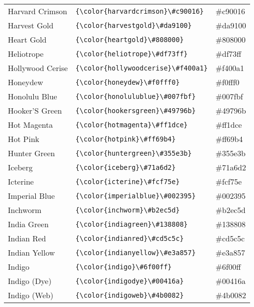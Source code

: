 \documentclass[9.5pt]{article}
\begin{document}
\begin{longtable}{l | l | l}
	Harvard Crimson & \verb!{\color{harvardcrimson}\#c90016}! & {\color{harvardcrimson}\#c90016}\\
	Harvest Gold & \verb!{\color{harvestgold}\#da9100}! & {\color{harvestgold}\#da9100}\\
	Heart Gold & \verb!{\color{heartgold}\#808000}! & {\color{heartgold}\#808000}\\
	Heliotrope & \verb!{\color{heliotrope}\#df73ff}! & {\color{heliotrope}\#df73ff}\\
	Hollywood Cerise & \verb!{\color{hollywoodcerise}\#f400a1}! & {\color{hollywoodcerise}\#f400a1}\\
	Honeydew & \verb!{\color{honeydew}\#f0fff0}! & {\color{honeydew}\#f0fff0}\\
	Honolulu Blue & \verb!{\color{honolulublue}\#007fbf}! & {\color{honolulublue}\#007fbf}\\
	Hooker'S Green & \verb!{\color{hookersgreen}\#49796b}! & {\color{hookersgreen}\#49796b}\\
	Hot Magenta & \verb!{\color{hotmagenta}\#ff1dce}! & {\color{hotmagenta}\#ff1dce}\\
	Hot Pink & \verb!{\color{hotpink}\#ff69b4}! & {\color{hotpink}\#ff69b4}\\
	Hunter Green & \verb!{\color{huntergreen}\#355e3b}! & {\color{huntergreen}\#355e3b}\\
	Iceberg & \verb!{\color{iceberg}\#71a6d2}! & {\color{iceberg}\#71a6d2}\\
	Icterine & \verb!{\color{icterine}\#fcf75e}! & {\color{icterine}\#fcf75e}\\
	Imperial Blue & \verb!{\color{imperialblue}\#002395}! & {\color{imperialblue}\#002395}\\
	Inchworm & \verb!{\color{inchworm}\#b2ec5d}! & {\color{inchworm}\#b2ec5d}\\
	India Green & \verb!{\color{indiagreen}\#138808}! & {\color{indiagreen}\#138808}\\
	Indian Red & \verb!{\color{indianred}\#cd5c5c}! & {\color{indianred}\#cd5c5c}\\
	Indian Yellow & \verb!{\color{indianyellow}\#e3a857}! & {\color{indianyellow}\#e3a857}\\
	Indigo & \verb!{\color{indigo}\#6f00ff}! & {\color{indigo}\#6f00ff}\\
	Indigo (Dye) & \verb!{\color{indigodye}\#00416a}! & {\color{indigodye}\#00416a}\\
	Indigo (Web) & \verb!{\color{indigoweb}\#4b0082}! & {\color{indigoweb}\#4b0082}\\

\end{longtable}
\end{document}

